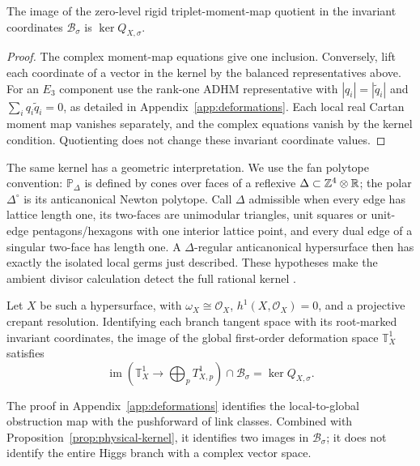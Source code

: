 \begin{proposition}\label{prop:physical-kernel}
The image of the zero-level rigid triplet-moment-map quotient
in the invariant coordinates $\mathcal B_\sigma$ is
$\ker Q_{X,\sigma}$.
\end{proposition}
\begin{proof}
The complex moment-map equations give one inclusion. Conversely,
lift each coordinate of a vector in the kernel by the balanced
representatives above. For an $E_3$ component use the rank-one
ADHM representative with $|q_i|=|\widetilde q_i|$ and
$\sum_iq_i\widetilde q_i=0$, as detailed in
Appendix~\ref{app:deformations}. Each local real Cartan moment
map vanishes separately, and the complex equations vanish by
the kernel condition. Quotienting does not change these invariant
coordinate values.
\end{proof}

The same kernel has a geometric interpretation. We use the fan
polytope convention: $\mathbb P_\Delta$ is defined by cones over
faces of a reflexive $\Delta\subset\mathbb Z^4\otimes\mathbb R$;
the polar $\Delta^\circ$ is its anticanonical Newton polytope.
Call $\Delta$ admissible when every edge has lattice length one,
its two-faces are unimodular triangles, unit squares or unit-edge
pentagons/hexagons with one interior lattice point, and every dual
edge of a singular two-face has length one. A $\Delta$-regular
anticanonical hypersurface then has exactly the isolated local
germs just described. These hypotheses make the ambient divisor
calculation detect the full rational kernel
\cite{Batyrev:1994,Wuebben:2026obstruction}.

\begin{theorem}\label{thm:first-order-image}
Let $X$ be such a hypersurface, with $\omega_X\cong\mathcal O_X$,
$h^1(X,\mathcal O_X)=0$, and a projective crepant resolution.
Identifying each branch tangent space with its root-marked
invariant coordinates, the image of the global first-order
deformation space $\mathbb T_X^1$ satisfies
\begin{equation}
 \operatorname{im}\left(\mathbb T_X^1\longrightarrow
                     \bigoplus_pT^1_{X,p}\right)
       \cap\mathcal B_\sigma=\ker Q_{X,\sigma}.
 \label{eq:first-order-image-theorem}
\end{equation}
\end{theorem}
The proof in Appendix~\ref{app:deformations} identifies the
local-to-global obstruction map with the pushforward of link
classes. Combined with Proposition~\ref{prop:physical-kernel},
it identifies two images in $\mathcal B_\sigma$; it does not
identify the entire Higgs branch with a complex vector space.

